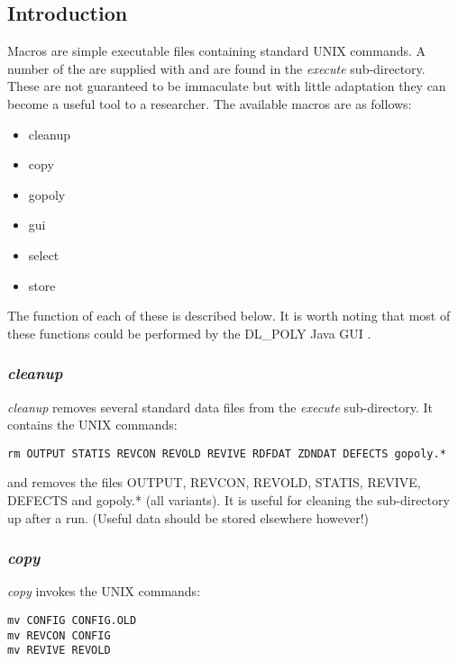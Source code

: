 \label{macros}
\subsection*{Introduction}

Macros are simple executable files containing standard UNIX
commands.  A number of the are supplied with \D and are found in
the {\em execute} sub-directory.  These are
not guaranteed to be immaculate but with little adaptation they
can become a useful tool to a researcher.  The available macros
are as follows:

{\sl
\begin{itemize}
\item cleanup
\item copy
\item gopoly
\item gui
\item select
\item store
\end{itemize}
}

\noindent The function of each of these is described below.  It is
worth noting that most of these functions could be performed by the
DL\_POLY Java GUI \cite{smith-gui}.

\subsubsection*{{\sl cleanup}}

{\sl cleanup} removes several standard data files from the {\em
execute} sub-directory.  It contains the UNIX
commands:
\begin{verbatim}
rm OUTPUT STATIS REVCON REVOLD REVIVE RDFDAT ZDNDAT DEFECTS gopoly.*
\end{verbatim}
\noindent and removes the files OUTPUT, REVCON, REVOLD, STATIS,
REVIVE, DEFECTS and gopoly.* (all variants).  It is useful for
cleaning the sub-directory up after a run.
(Useful data should be stored elsewhere however!)

\subsubsection*{{\sl copy}}

{\sl copy} invokes the UNIX commands:

\begin{verbatim}
mv CONFIG CONFIG.OLD
mv REVCON CONFIG
mv REVIVE REVOLD
\end{verbatim}

